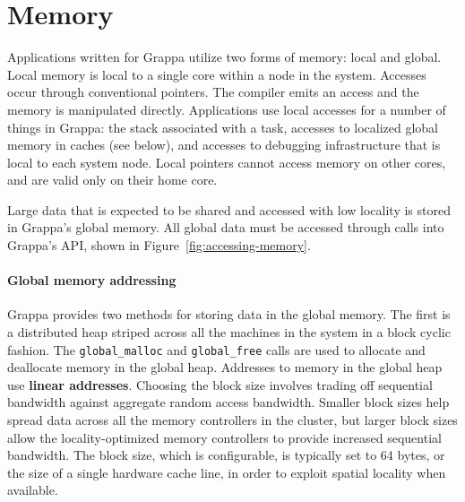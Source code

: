 \section{Memory}

Applications written for Grappa utilize two forms of memory: local and global.
Local memory is local to a single core within a node in the system. Accesses
occur through conventional pointers. The compiler emits an access and the
memory is manipulated directly. Applications use local accesses for a number
of things in Grappa: the stack associated with a task, accesses to localized
global memory in caches (see below), and accesses to debugging infrastructure
that is local to each system node. Local pointers cannot access memory on
other cores, and are valid only on their home core.

Large data that is expected to be shared and accessed with low locality is
stored in Grappa's global memory. All global data must be accessed through
calls into Grappa's API, shown in Figure~\ref{fig:accessing-memory}.

\paragraph{Global memory addressing} Grappa provides two methods for storing
data in the global memory. The first is a distributed heap striped across all
the machines in the system in a block cyclic fashion. The
\texttt{global\_malloc} and \texttt{global\_free} calls are used to allocate
and deallocate memory in the global heap. Addresses to memory in the global
heap use \textbf{linear addresses}. Choosing the block size involves trading
off sequential bandwidth against aggregate random access bandwidth. Smaller
block sizes help spread data across all the memory controllers in the cluster,
but larger block sizes allow the locality-optimized memory controllers to
provide increased sequential bandwidth. The block size, which is configurable,
is typically set to 64 bytes, or the size of a single hardware cache line, in
order to exploit spatial locality when available. 


